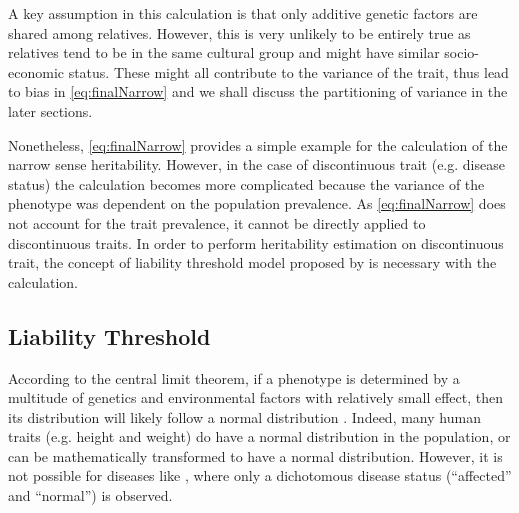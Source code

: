 	A key assumption in this calculation is that only additive genetic factors are shared among relatives.
	However, this is very unlikely to be entirely true as relatives tend to be in the same cultural group and might have similar socio-economic status.
	These might all contribute to the variance of the trait, thus lead to bias in \cref{eq:finalNarrow} and we shall discuss the partitioning of variance in the later sections.
	
	Nonetheless, \cref{eq:finalNarrow} provides a simple example for the calculation of the narrow sense heritability.
	However, in the case of discontinuous trait (e.g. disease status) the calculation becomes more complicated because the variance of the phenotype was dependent on the population prevalence.
	As \cref{eq:finalNarrow} does not account for the trait prevalence, it cannot be directly applied to discontinuous traits.
	In order to perform heritability estimation on discontinuous trait, the concept of liability threshold model proposed by \cite{Falconer1965} is necessary with the calculation.
	
	\subsection{Liability Threshold}
	\label{sec:liability}
	According to the central limit theorem, if a phenotype is determined by a multitude of genetics and environmental factors with relatively small effect, then its distribution will likely follow a normal distribution \citep{Visscher2008}.
	Indeed, many human traits (e.g. height and weight) do have a normal distribution in the population, or can be mathematically transformed to have a normal distribution. %
	However, it is not possible for diseases like , where only a dichotomous disease status (``affected'' and ``normal'') is observed. 
	
